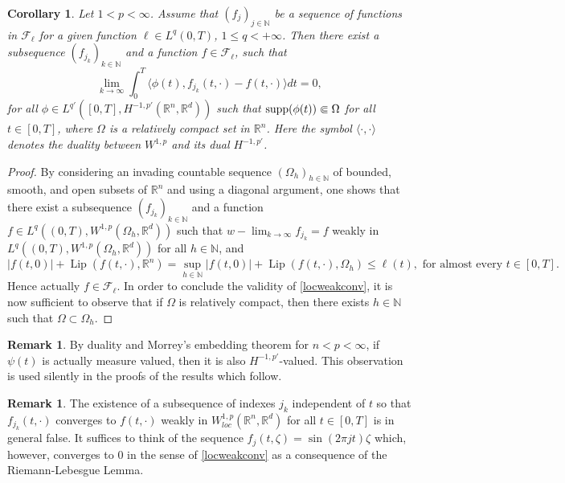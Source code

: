 \documentclass[11pt]{article}
\theoremstyle{plain}
\newtheorem{corollary}[theorem]{Corollary}
\theoremstyle{definition}
\newtheorem{remark}[theorem]{Remark}
\theoremstyle{remark}
\numberwithin{equation}{section}
\newcommand{\supp}{{\rm supp}}
\newcommand{\R}{{\mathbb R}}
\newcommand{\Rn}{{\R}^n}
\begin{document}
\begin{corollary}\label{cor:1}
Let $1<p < \infty$. Assume that  $(f_j)_{j \in \mathbb N}$ be a sequence of functions in $\mathcal F_\ell$ for a given function $\ell \in L^q(0,T)$, $1\le q<+\infty$. Then there exist a subsequence  $(f_{j_k})_{k \in \mathbb N}$ and a function $f\in \mathcal F_\ell$, such that
\begin{equation}\label{locweakconv}
\lim_{k \to \infty} \int_0^T \langle \phi(t), f_{j_k}(t, \cdot) -  f(t, \cdot) \rangle dt = 0,
\end{equation}
for all $\phi \in L^{q'}([0,T], H^{-1,p'}(\mathbb R^n, \mathbb R^d))$ such that $\supp (\phi(t)) \Subset  \Omega$ for all $t \in [0,T]$, where $\Omega$ is a relatively compact set in $\mathbb R^n$. Here the symbol $\langle \cdot, \cdot \rangle$ denotes the duality between $W^{1,p}$ and its dual $H^{-1,p'}$.
\end{corollary}
\begin{proof}
By considering an invading countable sequence $(\Omega_h)_{h \in \mathbb N}$ of bounded, smooth, and open subsets of $\mathbb R^n$ and using a diagonal argument, one shows that 
there exist a subsequence  $(f_{j_k})_{k \in \mathbb N}$ and a function $f \in L^q((0,T),W^{1,p}(\Omega_h, \mathbb R^d))$ such that $w-\lim_{k \to \infty} f_{j_k} = f$ weakly in $L^q((0,T),W^{1,p}(\Omega_h, \mathbb R^d))$ for all $h \in \mathbb N$, and  
$$
|f(t,0) | + \operatorname{Lip}(f(t, \cdot),\mathbb R^n) = \sup_{h \in\mathbb N} |f(t,0) | + \operatorname{Lip}(f(t, \cdot),\Omega_h) \leq \ell(t), \mbox{ for almost every } t \in [0,T].
$$
Hence actually $f \in \mathcal F_\ell$. In order to conclude the validity of \eqref{locweakconv}, it is now sufficient to observe
that if $\Omega$ is relatively compact, then there exists $h \in \mathbb N$ such that $\Omega \subset \Omega_h$.
\end{proof}
\begin{remark}
By duality and Morrey's embedding theorem for $n< p < \infty$, if $\psi(t)$ is actually measure valued, then it is also  $H^{-1,p'}$-valued. This observation is used silently in 
the proofs of the results which follow.
\end{remark}

\begin{remark}\label{counterexamp}
The existence of a subsequence of indexes $j_k$ independent of $t$ so that $f_{j_k}(t,\cdot)$ converges to $f(t,\cdot)$ weakly in $W^{1,p}_{loc}(\Rn,\R^d)$ for all $t \in [0, T]$ is in general false. It suffices to think of the sequence $f_{j}(t,\zeta)=\sin(2\pi jt)\zeta$ which, however, converges to $0$ in the sense of \eqref{locweakconv} as a consequence of the Riemann-Lebesgue Lemma.
\end{remark}
\end{document}
